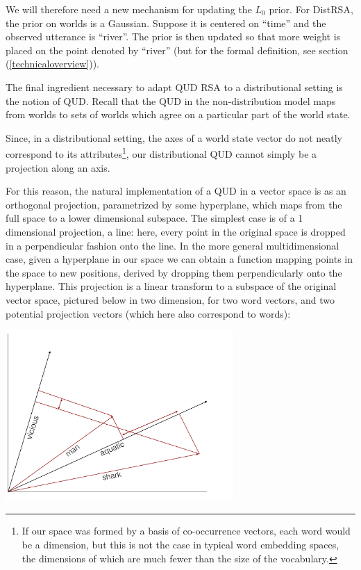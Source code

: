 \documentclass[10pt,letterpaper,twocolumn]{article}
\begin{document}
We will therefore need a new mechanism for updating the $L_0$ prior. For DistRSA, the prior on worlds is a Gaussian. Suppose it is centered on ``time'' and the observed utterance is ``river''. The prior is then updated so that more weight is placed on the point denoted by ``river'' (but for the formal definition, see section (\ref{technicaloverview})). 

The final ingredient necessary to adapt QUD RSA to a distributional setting is the notion of QUD. Recall that the QUD in the non-distribution model maps from worlds to sets of worlds which agree on a particular part of the world state. 

Since, in a distributional setting, the axes of a world state vector do not neatly correspond to its attributes\footnote{If our space was formed by a basis of co-occurrence vectors, each word would be a dimension, but this is not the case in typical word embedding spaces, the dimensions of which are much fewer than the size of the vocabulary.}, our distributional QUD cannot simply be a projection along an axis. 

For this reason, the natural implementation of a QUD in a vector space is as an orthogonal projection, parametrized by some hyperplane, which maps from the full space to a lower dimensional subspace. The simplest case is of a 1 dimensional projection, a line: here, every point in the original space is dropped in a perpendicular fashion onto the line. In the more general multidimensional case, given a hyperplane in our space we can obtain a function mapping points in the space to new positions, derived by dropping them perpendicularly onto the hyperplane. This projection is a linear transform to a subspace of the original vector space, pictured below in two dimension, for two word vectors, and two potential projection vectors (which here also correspond to words):

\includegraphics[height=6.5cm]{diagram2.pdf}
\end{document}
